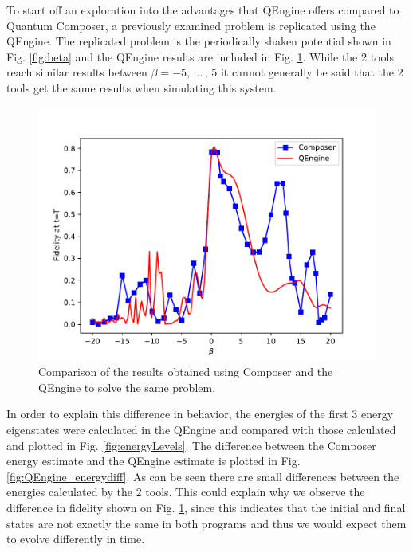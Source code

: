 \documentclass[a4paper, twocolumn]{revtex4-1}
\begin{document}
To start off an exploration into the advantages that QEngine offers compared to Quantum Composer, a previously examined problem is replicated using the QEngine. The replicated problem is the periodically shaken potential shown in Fig. \ref{fig:beta} and the QEngine results are included in Fig. \ref{fig:QEngine_nonOPt}. While the 2 tools reach similar results between $\beta = -5, \, ...\, , \, 5$ it cannot generally be said that the 2 tools get the same results when simulating this system.
\begin{figure}
	\includegraphics[width=\columnwidth]{graphics/qengine/comparison.pdf}
	\caption{Comparison of the results obtained using Composer and the QEngine to solve the same problem.}
	\label{fig:QEngine_nonOPt}
\end{figure}

In order to explain this difference in behavior, the energies of the first 3 energy eigenstates were calculated in the QEngine and compared with those calculated and plotted in Fig. \ref{fig:energyLevels}. The difference between the Composer energy estimate and the QEngine estimate is plotted in Fig. \ref{fig:QEngine_energydiff}. As can be seen there are small differences between the energies calculated by the 2 tools. This could explain why we observe the difference in fidelity shown on Fig. \ref{fig:QEngine_nonOPt}, since this indicates that the initial and final states are not exactly the same in both programs and thus we would expect them to evolve differently in time.\\
\end{document}
